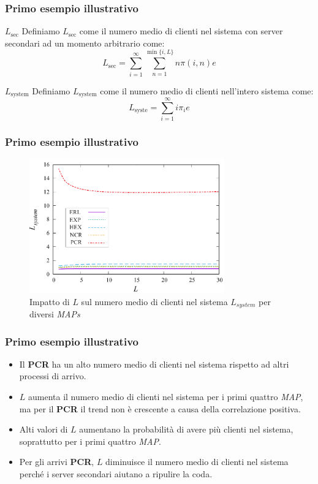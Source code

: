\documentclass{beamer}
\begin{document}
\begin{frame}
    \frametitle{Primo esempio illustrativo}
    \begin{block}{$L_{\mathrm{sec}}$}
        Definiamo $L_{\mathrm{sec}}$ come il numero medio di clienti nel sistema con server secondari ad un momento arbitrario come:
        $$ L_{\mathrm{sec}} = \sum_{i=1}^{\infty} \sum_{n=1}^{\min\{i,L\}} n \pi (i,n) e $$
    \end{block}
    \begin{block}{$L_{\mathrm{system}}$}
        Definiamo $L_{\mathrm{system}}$ come il numero medio di clienti nell'intero sistema come:
        $$ L_{\mathrm{syste}} = \sum_{i=1}^{\infty} i \pi_i e $$
    \end{block}
\end{frame}

\begin{frame}
    \frametitle{Primo esempio illustrativo}
    \begin{figure}[h]
        \centering
        \includegraphics[width=0.75\textwidth]{gtHnIzQ.png}
        \caption{Impatto di $L$ sul numero medio di clienti nel sistema $L_{system}$ per diversi \emph{MAPs}}
        \label{fig:1}
    \end{figure}
\end{frame}


\begin{frame}
    \frametitle{Primo esempio illustrativo}
        \begin{itemize}
            \item Il \textbf{PCR} ha un alto numero medio di clienti nel sistema rispetto ad altri processi di arrivo.
            \item $L$ aumenta il numero medio di clienti nel sistema per i primi quattro \emph{MAP}, ma per il \textbf{PCR} il trend non è crescente a causa della correlazione positiva.
            \item Alti valori di $L$ aumentano la probabilità di avere più clienti nel sistema, soprattutto per i primi quattro \emph{MAP}.
            \item Per gli arrivi \textbf{PCR}, $L$ diminuisce il numero medio di clienti nel sistema perché i server secondari aiutano a ripulire la coda.
        \end{itemize}
\end{frame}
\end{document}
